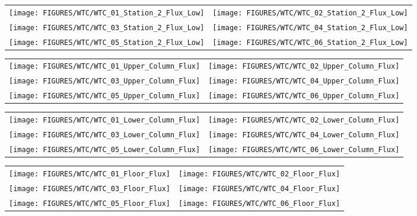 \begin{figure}[p]
\begin{tabular*}{\textwidth}{l@{\extracolsep{\fill}}r}
\texttt{[image: FIGURES/WTC/WTC\_01\_Station\_2\_Flux\_Low]} &
\texttt{[image: FIGURES/WTC/WTC\_02\_Station\_2\_Flux\_Low]} \\
\texttt{[image: FIGURES/WTC/WTC\_03\_Station\_2\_Flux\_Low]} &
\texttt{[image: FIGURES/WTC/WTC\_04\_Station\_2\_Flux\_Low]} \\
\texttt{[image: FIGURES/WTC/WTC\_05\_Station\_2\_Flux\_Low]} &
\texttt{[image: FIGURES/WTC/WTC\_06\_Station\_2\_Flux\_Low]}
\end{tabular*}
\label{NIST_WTC_Station_2_Flux_Low}
\end{figure}

\begin{figure}[p]
\begin{tabular*}{\textwidth}{l@{\extracolsep{\fill}}r}
\texttt{[image: FIGURES/WTC/WTC\_01\_Upper\_Column\_Flux]} &
\texttt{[image: FIGURES/WTC/WTC\_02\_Upper\_Column\_Flux]} \\
\texttt{[image: FIGURES/WTC/WTC\_03\_Upper\_Column\_Flux]} &
\texttt{[image: FIGURES/WTC/WTC\_04\_Upper\_Column\_Flux]} \\
\texttt{[image: FIGURES/WTC/WTC\_05\_Upper\_Column\_Flux]} &
\texttt{[image: FIGURES/WTC/WTC\_06\_Upper\_Column\_Flux]}
\end{tabular*}
\label{NIST_WTC_Upper_Column_Flux}
\end{figure}

\begin{figure}[p]
\begin{tabular*}{\textwidth}{l@{\extracolsep{\fill}}r}
\texttt{[image: FIGURES/WTC/WTC\_01\_Lower\_Column\_Flux]} &
\texttt{[image: FIGURES/WTC/WTC\_02\_Lower\_Column\_Flux]} \\
\texttt{[image: FIGURES/WTC/WTC\_03\_Lower\_Column\_Flux]} &
\texttt{[image: FIGURES/WTC/WTC\_04\_Lower\_Column\_Flux]} \\
\texttt{[image: FIGURES/WTC/WTC\_05\_Lower\_Column\_Flux]} &
\texttt{[image: FIGURES/WTC/WTC\_06\_Lower\_Column\_Flux]}
\end{tabular*}
\label{NIST_WTC_Lower_Column_Flux}
\end{figure}

\begin{figure}[p]
\begin{tabular*}{\textwidth}{l@{\extracolsep{\fill}}r}
\texttt{[image: FIGURES/WTC/WTC\_01\_Floor\_Flux]} &
\texttt{[image: FIGURES/WTC/WTC\_02\_Floor\_Flux]} \\
\texttt{[image: FIGURES/WTC/WTC\_03\_Floor\_Flux]} &
\texttt{[image: FIGURES/WTC/WTC\_04\_Floor\_Flux]} \\
\texttt{[image: FIGURES/WTC/WTC\_05\_Floor\_Flux]} &
\texttt{[image: FIGURES/WTC/WTC\_06\_Floor\_Flux]}
\end{tabular*}
\label{NIST_WTC_Floor_Flux}
\end{figure}

